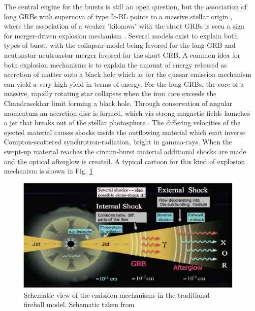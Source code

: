 The central engine for the bursts is still an open question, but the association
of long GRBs with supernova of type Ic-BL points to a massive stellar origin
\citep{Woosley2006, Hjorth2013}, where the association of a weaker "kilonova"
with the short GRBs is seen a sign for merger-driven explosion mechanism
\citep{Tanvir2013}. Several models exist to explain both types of burst, with
the collapsar-model being favored for the long GRB and neutonstar-neutronstar
merger favored for the short GRB. A common idea for both explosion mechanisms is
to explain the amount of energy released as accretion of matter onto a black
hole which as for the quasar emission mechanism can yield a very high yield in
terms of energy. For the long GRBs, the core of a massive, rapidly rotating star
collapses when the iron core exceeds the Chandrasekhar limit forming a black
hole. Through conservation of angular momentum an accretion disc is formed,
which via strong magnetic fields launches a jet that breaks out of the stellar
photosphere \citep{Woosley2006a}. The differing velocities of the ejected
material causes shocks inside the outflowing material which emit inverse
Compton-scattered synchrotron-radiation, bright in gamma-rays.  When the
swept-up material reaches the circum-burst material additional shocks are made
and the optical afterglow is created. A typical cartoon for this kind of
explosion mechanism is shown in Fig. \ref{fig:intro:grbglow}


\begin{figure}[htb]
	\includegraphics[width=\textwidth]{gfx/grbmec}
	\caption{Schematic view of the emission mechanisms in the traditional fireball
model. Schematic taken from \citet{Meszaros2014}}
	\label{fig:intro:grbglow}
\end{figure}

